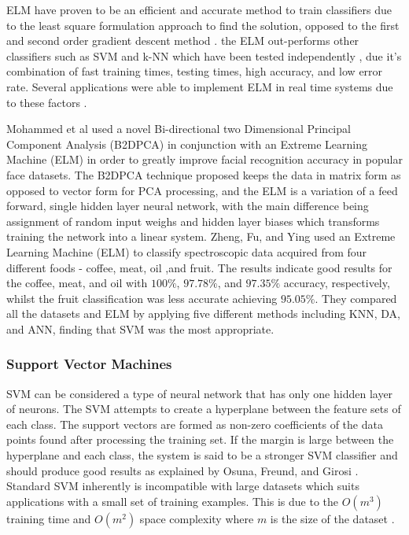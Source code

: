 \documentclass[fleqn,twoside]{article}
\begin{document}
ELM have proven to be an efficient and accurate method to train classifiers due to the least square formulation approach to find the solution, opposed to the first and second order gradient descent method \cite{yavs}. the ELM out-performs other classifiers such as SVM and k-NN which have been tested independently \cite{yavs, wan, peng}, due it's combination of fast training times, testing times, high accuracy, and low error rate. Several applications were able to implement ELM in real time systems due to these factors \cite{xu, yavs}.  

Mohammed et al \cite{mohammed} used a novel Bi-directional two Dimensional Principal Component Analysis (B2DPCA) in conjunction with an Extreme Learning Machine (ELM) in order to greatly improve facial recognition accuracy in popular face datasets. The B2DPCA technique proposed keeps the data in matrix form as opposed to vector form for PCA processing, and the ELM is a variation of a feed forward, single hidden layer neural network, with the main difference being assignment of random input weighs and hidden layer biases which transforms training the network into a linear system. Zheng, Fu, and Ying \cite{zheng} used an Extreme Learning Machine (ELM) to classify spectroscopic data acquired from four different foods - coffee, meat, oil ,and fruit. The results indicate good results for the coffee, meat, and oil with $100\%$, $97.78\%$, and $97.35\%$ accuracy, respectively, whilst the fruit classification was less accurate achieving $95.05\%$. They compared all the datasets and ELM by applying five different methods including KNN, DA, and ANN, finding that SVM was the most appropriate. 


\subsubsection{Support Vector Machines}


SVM can be considered a type of neural network that has only one hidden layer of neurons. The SVM attempts to create a hyperplane between the feature sets of each class. The support vectors are formed as non-zero coefficients of the data points found after processing the training set. If the margin is large between the hyperplane and each class, the system is said to be a stronger SVM classifier and should produce good results as explained by Osuna, Freund, and Girosi \cite{osuna}. Standard SVM inherently is incompatible with large datasets which suits applications with a small set of training examples. This is due to the $O(m^3)$ training time and $O(m^2)$ space complexity where $m$ is the size of the dataset \cite{tsang}.
\end{document}
